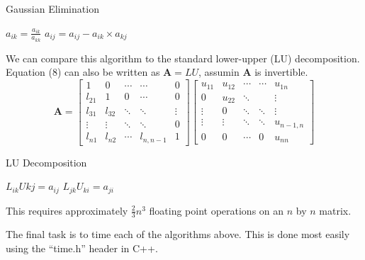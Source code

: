 \documentclass[11pt]{article}
\begin{document}
    \begin{algorithm}
    \caption{Gaussian Elimination}
    \label{Gaussian Elimination}
    \begin{algorithmic}[1]
    \State $a_{ik} = \frac{a_{ik}}{a_{kk}}$
    \State $a_{ij}=a_{ij}-a_{ik}\times a_{kj}$
    \EndFor
    \EndFor
    \EndFor
    \EndFunction
    \end{algorithmic}
    \end{algorithm}

    We can compare this algorithm to the standard lower-upper (LU) decomposition. Equation (8) can also be written as $\mathbf{A}=LU$, assumin $\mathbf{A}$ is invertible. 
    \begin{equation}
    \mathbf{A} = \left[ \begin{array}{ccccc} 1&0&\cdots &\cdots &0\\ l_{21} & 1 & 0 & \cdots & 0 \\ l_{31} & l_{32} & \ddots & \ddots & \vdots \\ \vdots &\vdots &\ddots & \ddots &0 \\ l_{n1} &l_{n2} &\cdots & l_{n,n-1}& 1 \end{array} \right] \left[ \begin{array}{ccccc} u_{11} & u_{12} &\cdots &\cdots &u_{1n} \\ 0&u_{22}&\ddots&&\vdots \\ \vdots&0&\ddots&\ddots&\vdots \\ \vdots&\vdots&\ddots&\ddots&u_{n-1,n} \\ 0&0&\cdots&0&u_{nn} \end{array} \right]
    \end{equation}

    \begin{algorithm}
    \caption{LU Decomposition}
    \label{LU Decomp}
    \begin{algorithmic}[1]
    \State $L_{ik}U{kj}=a_{ij}$
    \EndFor
    \State $L_{jk}U_{ki}=a_{ji}$
    \EndFor
    \EndFor
    \EndFunction
    \end{algorithmic}
    \end{algorithm}

    This requires approximately $\frac{2}{3}n^3$ floating point operations on an $n$ by $n$ matrix. \pagebreak

    The final task is to time each of the algorithms above. This is done most easily using the ``time.h'' header in C++.
\end{document}
